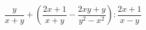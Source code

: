 \begin{ex}[type=expression]
	\begin{condition}
		\( \dfrac{y}{x+y}+\left( \dfrac{2x+1}{x+y}-\dfrac{2xy+y}{y^2-x^2} \right):\dfrac{2x+1}{x-y} \)
	\end{condition}
\end{ex}